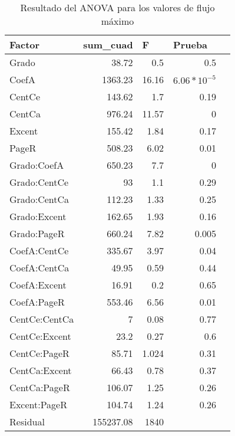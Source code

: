 \documentclass{article}
\begin{document}
\begin{table}[htbp]
  \centering
  \caption{Resultado del ANOVA para los valores de flujo máximo}
    \begin{tabular}{|l|r|r|r|r|}
    \toprule
    \rowcolor[rgb]{ .357,  .608,  .835} \textbf{Factor} & \multicolumn{1}{l|}{\textbf{sum\_cuad}} & \multicolumn{1}{l|}{\textbf{F}} & \multicolumn{1}{l|}{\textbf{Prueba}} \\
    \midrule
    Grado & 38.72      & 0.5 & 0.5 \\
    \midrule
    CoefA & 1363.23      & 16.16 & $6.06*10^{-5}$ \\
    \midrule
    CentCe & 143.62     & 1.7 & 0.19 \\
    \midrule
    CentCa & 976.24     & 11.57 & 0 \\
    \midrule
    Excent & 155.42    & 1.84 & 0.17 \\
    \midrule
    PageR & 508.23   & 6.02 & 0.01 \\
    \midrule
    Grado:CoefA & 650.23      & 7.7 & 0 \\
    \midrule
    Grado:CentCe & 93   & 1.1 & 0.29 \\
    \midrule
    Grado:CentCa & 112.23     & 1.33 & 0.25 \\
    \midrule
    Grado:Excent & 162.65   & 1.93 & 0.16 \\
    \midrule
    Grado:PageR & 660.24     & 7.82 & 0.005 \\
    \midrule
    CoefA:CentCe & 335.67     & 3.97& 0.04 \\
    \midrule
    CoefA:CentCa & 49.95    & 0.59 & 0.44 \\
    \midrule
    CoefA:Excent & 16.91    & 0.2 & 0.65 \\
    \midrule
    CoefA:PageR & 553.46     & 6.56 & 0.01 \\
    \midrule
    CentCe:CentCa & 7     & 0.08 & 0.77 \\
    \midrule
    CentCe:Excent & 23.2     & 0.27 & 0.6 \\
    \midrule
    CentCe:PageR & 85.71     & 1.024 & 0.31 \\
    \midrule
    CentCa:Excent & 66.43     & 0.78 & 0.37 \\
    \midrule
    CentCa:PageR & 106.07     & 1.25 & 0.26 \\
    \midrule
    Excent:PageR & 104.74     & 1.24& 0.26 \\
    \midrule
    Residual & 155237.08 & 1840  &   \\
    \bottomrule
    \end{tabular}%
  \label{tab:Cuadro 2}%
\end{table}%
\end{document}
